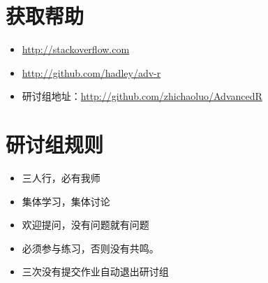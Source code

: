 \documentclass[]{article}
\begin{document}
\section{获取帮助}

\begin{itemize}
\item
  \url{http://stackoverflow.com}
\item
  \url{http://github.com/hadley/adv-r}
\item
  研讨组地址：\url{http://github.com/zhichaoluo/AdvancedR}
\end{itemize}

\section{研讨组规则}

\begin{itemize}
\item
  三人行，必有我师
\item
  集体学习，集体讨论
\item
  欢迎提问，没有问题就有问题
\item
  必须参与练习，否则没有共鸣。
\item
  三次没有提交作业自动退出研讨组
\end{itemize}
\end{document}

